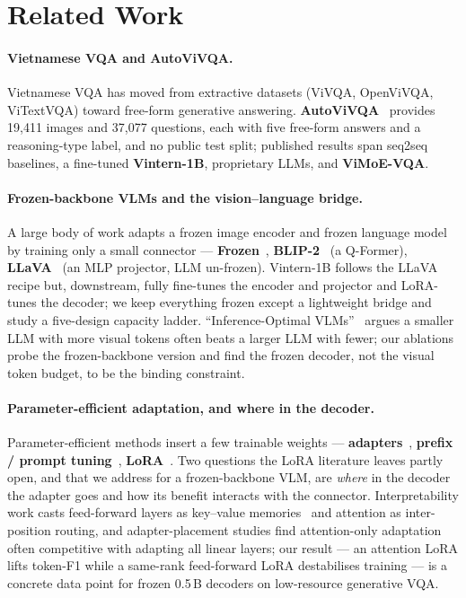 \section{Related Work}
\label{sec:related}

\paragraph{Vietnamese VQA and AutoViVQA.}
Vietnamese VQA has moved from extractive datasets (ViVQA, OpenViVQA, ViTextVQA)
toward free-form generative answering. \textbf{AutoViVQA}~\cite{autovivqa}
provides 19{,}411 images and 37{,}077 questions, each with five free-form answers
and a reasoning-type label, and no public test split; published results span
seq2seq baselines, a fine-tuned \textbf{Vintern-1B}, proprietary LLMs, and
\textbf{ViMoE-VQA}.

\paragraph{Frozen-backbone VLMs and the vision--language bridge.}
A large body of work adapts a frozen image encoder and frozen language model by
training only a small connector --- \textbf{Frozen}~\cite{frozen},
\textbf{BLIP-2}~\cite{blip2} (a Q-Former), \textbf{LLaVA}~\cite{llava} (an MLP
projector, LLM un-frozen). Vintern-1B follows the LLaVA recipe but, downstream,
fully fine-tunes the encoder and projector and LoRA-tunes the decoder; we keep
everything frozen except a lightweight bridge and study a five-design capacity
ladder. ``Inference-Optimal VLMs''~\cite{inferenceoptimalvlms} argues a smaller
LLM with more visual tokens often beats a larger LLM with fewer; our ablations
probe the frozen-backbone version and find the frozen decoder, not the visual
token budget, to be the binding constraint.

\paragraph{Parameter-efficient adaptation, and where in the decoder.}
Parameter-efficient methods insert a few trainable weights ---
\textbf{adapters}~\cite{adapters}, \textbf{prefix / prompt
tuning}~\cite{prefixtuning}, \textbf{LoRA}~\cite{lora}. Two questions the LoRA
literature leaves partly open, and that we address for a frozen-backbone VLM, are
\emph{where} in the decoder the adapter goes and how its benefit interacts with
the connector. Interpretability work casts feed-forward layers as key--value
memories~\cite{ffnkvmemory} and attention as inter-position routing, and
adapter-placement studies find attention-only adaptation often competitive with
adapting all linear layers; our result --- an attention LoRA lifts token-F1 while
a same-rank feed-forward LoRA destabilises training --- is a concrete data point
for frozen 0.5\,B decoders on low-resource generative VQA.

